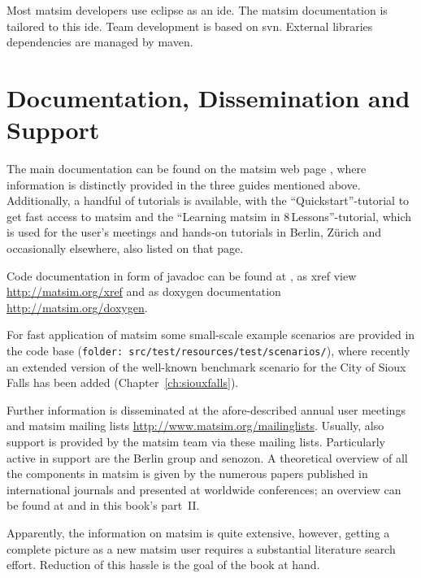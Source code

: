 Most \gls{matsim} developers use \gls{eclipse} as an \gls{ide}. The \gls{matsim} documentation is tailored to this \gls{ide}. Team development is based on \gls{svn}. External libraries dependencies are managed by \gls{maven}. 

\section{Documentation, Dissemination and Support}
The main documentation can be found on the \gls{matsim} web page \citep[][]{MATSIM-Docu_Webpage_2015}, where information is distinctly provided in the three guides mentioned above. Additionally, a handful of tutorials is available, with the ``Quickstart''-tutorial to get fast access to \gls{matsim} and the ``Learning \gls{matsim} in 8\,Lessons''-tutorial, which is used for the user's meetings and hands-on tutorials in Berlin, Zürich and occasionally elsewhere, also listed on that page. 

Code documentation in form of \gls{javadoc} can be found at \citet[][]{MATSIM-Javadoc_Webpage_2015}, as \gls{xref} view \url{http://matsim.org/xref} and as doxygen documentation \url{http://matsim.org/doxygen}. %

For fast application of \gls{matsim} some small-scale example scenarios are provided in the code base (\lstinline|folder: src/test/resources/test/scenarios/|), where recently an extended version of the well-known benchmark scenario for the City of Sioux Falls has been added \citep[][]{ChakirovFourie_TechRep_FCL_2014} (Chapter~\ref{ch:siouxfalls}).

Further information is disseminated at the afore-described annual user meetings and \gls{matsim} mailing lists \url{http://www.matsim.org/mailinglists}. Usually, also support is provided by the \gls{matsim} team via these mailing lists. Particularly active in support are the Berlin group and \gls{senozon}. A theoretical overview of all the components in \gls{matsim} is given by the numerous papers published in international journals and presented at worldwide conferences; an overview can be found at \citep[][]{MATSIM-Publications_Webpage_2015} and in this book's part~II.

Apparently, the information on \gls{matsim} is quite extensive, however, getting a complete picture as a new \gls{matsim} user requires a substantial literature search effort. Reduction of this hassle is the goal of the book at hand.

